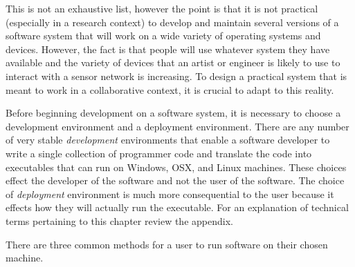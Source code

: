 This is not an exhaustive list, however the point is that it is not practical (especially in a research context) to develop and maintain several versions of a software system that will work on a wide variety of operating systems and devices. However, the fact is that people will use whatever system they have available and the variety of devices that an artist or engineer is likely to use to interact with a sensor network is increasing. To design a practical system that is meant to work in a collaborative context, it is crucial to adapt to this reality.

Before beginning development on a software system, it is necessary to choose a development environment and a deployment environment. There are any number of very stable \emph{development} environments that enable a software developer to write a single collection of programmer code and translate the code into executables that can run on Windows, OSX, and Linux machines. These choices effect the developer of the software and not the user of the software. The choice of \emph{deployment} environment is much more consequential to the user because it effects how they will actually run the executable. For an explanation of technical terms pertaining to this chapter review the appendix.

There are three common methods for a user to run software on their chosen machine.

